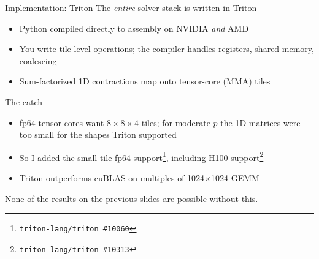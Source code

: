 \documentclass{beamer}
\begin{document}
\begin{frame}{Implementation: Triton}
    The \emph{entire} solver stack is written in \alert{Triton}
    \begin{itemize}
        \item Python compiled directly to assembly on NVIDIA \emph{and} AMD
        \item You write tile-level operations; the compiler handles registers, shared memory, coalescing
        \item Sum-factorized 1D contractions map onto tensor-core (MMA) tiles
    \end{itemize}
    \vfill
    \pause
    \begin{block}{The catch}
        \pause
        \begin{itemize}
            \item fp64 tensor cores want $8{\times}8{\times}4$ tiles; for moderate $p$ the 1D matrices were too small for the shapes
                  Triton supported \pause
            \item So I added the small-tile fp64 support\footnote{\texttt{triton-lang/triton \#10060}}, including H100
                  support\footnote{\texttt{triton-lang/triton \#10313}} \pause
            \item Triton \alert{outperforms cuBLAS} on multiples of 1024$\times$1024 GEMM
        \end{itemize}
    \end{block}
    \vfill
    \pause
    None of the results on the previous slides are possible without this.
\end{frame}
\end{document}
